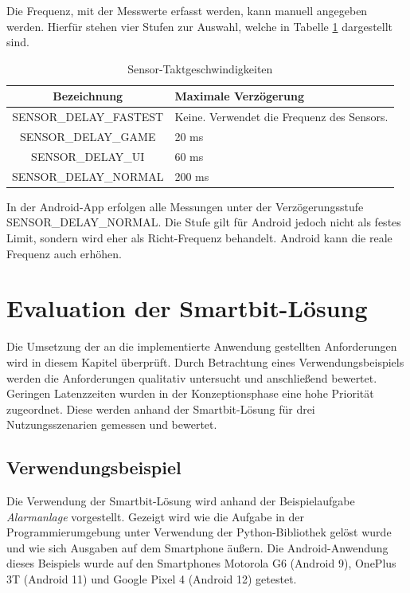 \documentclass[11pt,a4paper]{report}
\begin{document}
Die Frequenz, mit der Messwerte erfasst werden, kann manuell angegeben werden.
Hierfür stehen vier Stufen zur Auswahl, welche in Tabelle \ref{tab:sensor_speeds} dargestellt sind.
\begin{table}[htbp]
  \centering
  \begin{tabular}{|c|p{4cm}|}
      \hline
      \textbf{Bezeichnung} & \textbf{Maximale Verzögerung} \\
	  \hline
      SENSOR\_DELAY\_FASTEST & Keine. Verwendet die Frequenz des Sensors.\\
      \hline
      SENSOR\_DELAY\_GAME & 20 ms\\
      \hline
      SENSOR\_DELAY\_UI & 60 ms\\
      \hline
      SENSOR\_DELAY\_NORMAL & 200 ms\\
      \hline
  \end{tabular}
  \caption{Sensor-Taktgeschwindigkeiten\cite{sensor-takt}}
  \label{tab:sensor_speeds}
\end{table}
In der Android-App erfolgen alle Messungen unter der Verzögerungsstufe SENSOR\_DELAY\_NORMAL.
Die Stufe gilt für Android jedoch nicht als festes Limit, sondern wird eher als Richt-Frequenz behandelt.
Android kann die reale Frequenz auch erhöhen.

\chapter{Evaluation der Smartbit-Lösung}\label{chap:eval}
Die Umsetzung der an die implementierte Anwendung gestellten Anforderungen wird in diesem Kapitel überprüft.
Durch Betrachtung eines Verwendungsbeispiels werden die Anforderungen qualitativ untersucht und anschließend bewertet.
Geringen Latenzzeiten wurden in der Konzeptionsphase eine hohe Priorität zugeordnet.
Diese werden anhand der Smartbit-Lösung für drei Nutzungsszenarien gemessen und bewertet.

\section{Verwendungsbeispiel}
Die Verwendung der Smartbit-Lösung wird anhand der Beispielaufgabe \textit{Alarmanlage} vorgestellt.
Gezeigt wird wie die Aufgabe in der Programmierumgebung unter Verwendung der Python-Bibliothek gelöst wurde und wie sich Ausgaben auf dem Smartphone äußern.
Die Android-Anwendung dieses Beispiels wurde auf den Smartphones Motorola G6 (Android 9), OnePlus 3T (Android 11) und Google Pixel 4 (Android 12) getestet.
\end{document}
